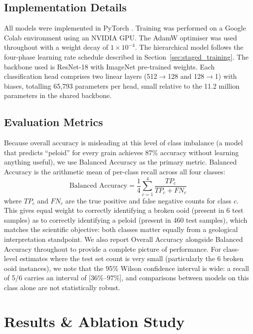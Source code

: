 \documentclass[a4paper,fleqn]{cas-dc}
\begin{document}
\subsection{Implementation Details}
All models were implemented in PyTorch \citep{paszke2019pytorch}. Training was performed on a Google Colab environment using an NVIDIA GPU. The AdamW optimiser \citep{loshchilov2019adamw} was used throughout with a weight decay of $1\times10^{-4}$. The hierarchical model follows the four-phase learning rate schedule described in Section~\ref{sec:staged_training}. The backbone used is ResNet-18 with ImageNet pre-trained weights. Each classification head comprises two linear layers (512$\rightarrow$128 and 128$\rightarrow$1) with biases, totalling 65,793 parameters per head, small relative to the 11.2 million parameters in the shared backbone.

\subsection{Evaluation Metrics}
Because overall accuracy is misleading at this level of class imbalance (a model that predicts ``peloid'' for every grain achieves 87\% accuracy without learning anything useful), we use Balanced Accuracy \citep{brodersen2010balanced} as the primary metric. Balanced Accuracy is the arithmetic mean of per-class recall across all four classes:
\begin{equation}
\text{Balanced Accuracy} = \frac{1}{4}\sum_{c=1}^{4} \frac{TP_c}{TP_c + FN_c}
\end{equation}
where $TP_c$ and $FN_c$ are the true positive and false negative counts for class $c$. This gives equal weight to correctly identifying a broken ooid (present in 6 test samples) as to correctly identifying a peloid (present in 460 test samples), which matches the scientific objective: both classes matter equally from a geological interpretation standpoint. We also report Overall Accuracy alongside Balanced Accuracy throughout to provide a complete picture of performance. For class-level estimates where the test set count is very small (particularly the 6 broken ooid instances), we note that the 95\% Wilson confidence interval is wide: a recall of 5/6 carries an interval of [36\%--97\%], and comparisons between models on this class alone are not statistically robust.

\section{Results \& Ablation Study}
\end{document}
